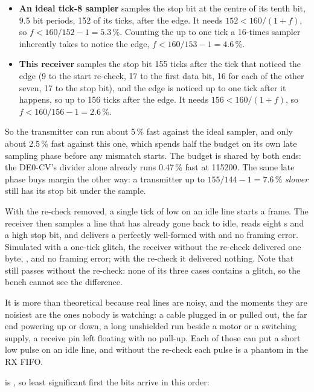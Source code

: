 \begin{itemize}
  \item \textbf{An ideal tick-8 sampler} samples the stop bit at the centre of its tenth bit, 9.5 bit
    periods, 152 of its ticks, after the edge. It needs $152 < 160/(1+f)$, so $f < 160/152 - 1 =
    5.3\,\%$. Counting the up to one tick a 16-times sampler inherently takes to notice the edge,
    $f < 160/153 - 1 = 4.6\,\%$.
  \item \textbf{This receiver} samples the stop bit 155 ticks after the tick that noticed the edge
    (9 to the start re-check, 17 to the first data bit, 16 for each of the other seven, 17 to the
    stop bit), and the edge is noticed up to one tick after it happens, so up to 156 ticks after the
    edge. It needs $156 < 160/(1+f)$, so $f < 160/156 - 1 = 2.6\,\%$.
\end{itemize}

\noindent So the transmitter can run about 5\,\% fast against the ideal sampler, and only about
2.5\,\% fast against this one, which spends half the budget on its own late sampling phase before
any mismatch starts. The budget is shared by both ends: the DE0-CV's divider alone already runs
0.47\,\% fast at 115200. The same late phase buys margin the other way: a transmitter up to
$155/144 - 1 = 7.6\,\%$ \emph{slower} still has its stop bit under the sample.

 With the re-check removed, a single tick of low on an idle line starts a frame. The receiver
then samples a line that has already gone back to idle, reads eight s and a high stop bit,
and delivers a perfectly well-formed  with  and no framing error. Simulated
with a one-tick glitch, the receiver without the re-check delivered one byte, , and no
framing error; with the re-check it delivered nothing. Note that  still passes
without the re-check: none of its three cases contains a glitch, so the bench cannot see the
difference.

It is more than theoretical because real lines are noisy, and the moments they are noisiest are the
ones nobody is watching: a cable plugged in or pulled out, the far end powering up or down, a long
unshielded run beside a motor or a switching supply, a receive pin left floating with no pull-up.
Each of those can put a short low pulse on an idle line, and without the re-check each pulse is a
phantom  in the RX FIFO.

  is , so least significant first the bits arrive in this order:

